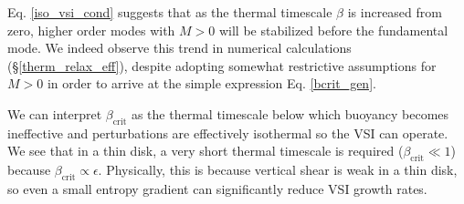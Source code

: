 Eq. \ref{iso_vsi_cond} suggests that as the thermal timescale $\beta$
is increased from zero, higher order modes with $M>0$
will be stabilized before the fundamental mode. We indeed observe this
trend in numerical calculations (\S\ref{therm_relax_eff}), despite
adopting somewhat restrictive assumptions for $M>0$ in order to arrive
at the simple expression Eq. \ref{bcrit_gen}. 


We can interpret  $\beta_\mathrm{crit}$ as the thermal timescale below
which buoyancy becomes ineffective and perturbations are effectively
isothermal so the VSI can operate.  We see that in a thin disk, a very short thermal timescale
is required ($\beta_\mathrm{crit}\ll 1$) because
$\beta_\mathrm{crit}\propto \epsilon$. Physically, this is because
vertical shear is weak in a thin disk, so even a small entropy
gradient can significantly reduce VSI growth rates.  







